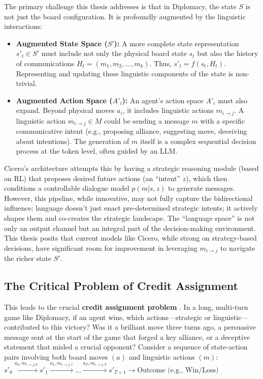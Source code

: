 \documentclass[oneside]{memoir}
\begin{document}
The primary challenge this thesis addresses is that in Diplomacy, the state $S$ is not just the board configuration. It is profoundly augmented by the linguistic interactions:
\begin{itemize}
    \item \textbf{Augmented State Space ($S'$):} A more complete state representation $s'_t \in S'$ must include not only the physical board state $s_t$ but also the history of communications $H_t = (m_1, m_2, \dots, m_k)$. Thus, $s'_t = f(s_t, H_t)$. Representing and updating these linguistic components of the state is non-trivial.
    \item \textbf{Augmented Action Space ($A'_i$):} An agent's action space $A'_i$ must also expand. Beyond physical moves $a_i$, it includes linguistic actions $m_{i \to j}$. A linguistic action $m_{i \to j} \in M$ could be sending a message $m$ with a specific communicative intent (e.g., proposing alliance, suggesting move, deceiving about intentions). The generation of $m$ itself is a complex sequential decision process at the token level, often guided by an LLM.
\end{itemize}
Cicero's architecture attempts this by having a strategic reasoning module (based on RL) that proposes desired future actions (an ``intent'' $z$), which then conditions a controllable dialogue model $p(m|s, z)$ to generate messages. However, this pipeline, while innovative, may not fully capture the bidirectional influence: language doesn't just enact pre-determined strategic intents; it actively shapes them and co-creates the strategic landscape. The ``language space'' is not only an output channel but an integral part of the decision-making environment. This thesis posits that current models like Cicero, while strong on strategy-based decisions, have significant room for improvement in leveraging $m_{i \to j}$ to navigate the richer state $S'$.

\subsection{The Critical Problem of Credit Assignment}

This leads to the crucial \textbf{credit assignment problem} \citep{10.5555/3312046}. In a long, multi-turn game like Diplomacy, if an agent wins, which actions—strategic or linguistic—contributed to this victory? Was it a brilliant move three turns ago, a persuasive message sent at the start of the game that forged a key alliance, or a deceptive statement that misled a crucial opponent?
Consider a sequence of state-action pairs involving both board moves $(a)$ and linguistic actions $(m)$:
$s'_0 \xrightarrow{a_0, m_{i \to j,0}} s'_1 \xrightarrow{a_1, m_{i \to j,1}} \dots \xrightarrow{a_T, m_{i \to j,T}} s'_{T+1} \rightarrow \text{Outcome (e.g., Win/Loss)}$
\end{document}
